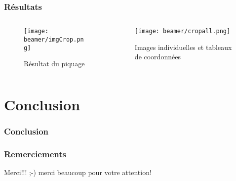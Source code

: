 \documentclass[11pt]{beamer}
\begin{document}
\begin{frame}
\frametitle{Résultats}
	\begin{columns}
		\begin{column}{5cm}
			\begin{figure}
				\texttt{[image: beamer/imgCrop.png]}
				
				Résultat du piquage
			\end{figure}
		\end{column}
		\begin{column}{5cm}
			\begin{figure}
				\texttt{[image: beamer/cropall.png]}
				
				Images individuelles et tableaux de coordonnées
			\end{figure}
		\end{column}
	\end{columns}
\end{frame}
\section{Conclusion}
\begin{frame}
\frametitle{Conclusion}
\end{frame}

\begin{frame}
\frametitle{Remerciements}
\begin{block}{Merci!!! ;-)}
merci beaucoup pour votre attention!
\end{block}
\end{frame}
\end{document}
